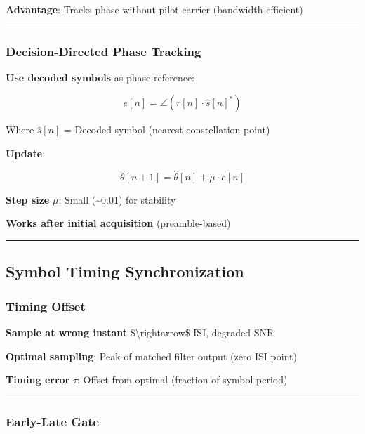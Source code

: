 \textbf{Advantage}: Tracks phase without pilot carrier (bandwidth
efficient)

\begin{center}\rule{0.5\linewidth}{0.5pt}\end{center}

\subsubsection{Decision-Directed Phase
Tracking}\label{decision-directed-phase-tracking}

\textbf{Use decoded symbols} as phase reference:

\[
e[n] = \angle(r[n] \cdot \hat{s}[n]^*)
\]

Where \(\hat{s}[n]\) = Decoded symbol (nearest constellation point)

\textbf{Update}:

\[
\hat{\theta}[n+1] = \hat{\theta}[n] + \mu \cdot e[n]
\]

\textbf{Step size} \(\mu\): Small (\textasciitilde0.01) for stability

\textbf{Works after initial acquisition} (preamble-based)

\begin{center}\rule{0.5\linewidth}{0.5pt}\end{center}

\subsection{Symbol Timing
Synchronization}\label{symbol-timing-synchronization}

\subsubsection{Timing Offset}\label{timing-offset}

\textbf{Sample at wrong instant} \$\textbackslash rightarrow\$ ISI,
degraded SNR

\textbf{Optimal sampling}: Peak of matched filter output (zero ISI
point)

\textbf{Timing error} \(\tau\): Offset from optimal (fraction of symbol
period)

\begin{center}\rule{0.5\linewidth}{0.5pt}\end{center}

\subsubsection{Early-Late Gate}\label{early-late-gate}


